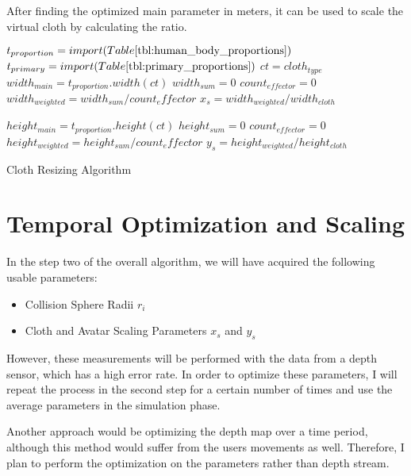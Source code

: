 After finding the optimized main parameter in meters, it can be used to scale the virtual cloth by calculating the ratio.

\begin{algorithm}
\dontprintsemicolon %

$t_{proportion}=import(Table \ref{tbl:human_body_proportions})$ \;
$t_{primary}=import(Table \ref{tbl:primary_proportions})$ \;
$ct=cloth_{type}$\;
$width_{main}=t_{proportion}.width(ct)$\;
$width_{sum}=0$\;
$count_{effector}=0$\;
$width_{weighted}=width_{sum}/count_effector$
$x_s=width_{weighted}/width_{cloth}$\;

$height_{main}=t_{proportion}.height(ct)$\;
$height_{sum}=0$\;
$count_{effector}=0$\;
$height_{weighted}=height_{sum}/count_effector$
$y_s=height_{weighted}/height_{cloth}$\;
\caption{Cloth Resizing Algorithm}
\label{algo:cloth_resize}
\end{algorithm}

\section{Temporal Optimization and Scaling}
In the step two of the overall algorithm, we will have acquired the following usable parameters:

\begin{itemize}
\item Collision Sphere Radii	$r_i$
\item Cloth and Avatar Scaling Parameters $x_s$ and $y_s$
\end{itemize}

However, these measurements will be performed with the data from a depth sensor, which has a high error rate. In order to optimize these parameters, I will repeat the process in the second step for a certain number of times and use the average parameters in the simulation phase. 

Another approach would be optimizing the depth map over a time period, although this method would suffer from the users movements as well. Therefore, I plan to perform the optimization on the parameters rather than depth stream.


